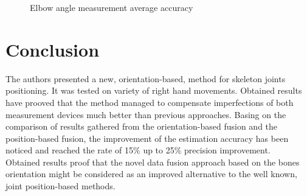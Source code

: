 \documentclass[9pt]{llncs}
\begin{document}
\begin{figure}[!htb]
	\vspace{2.5cm}
	\caption{Elbow angle measurement average accuracy}
	\label{fig:angleError}
\end{figure}

\section{Conclusion}
The authors presented a new, orientation-based, method for skeleton joints positioning. It was tested on variety of right hand movements. Obtained results have prooved that the method managed to compensate imperfections of both measurement devices much better than previous approaches. Basing on the comparison of results gathered from the orientation-based fusion and the position-based fusion, the improvement of the estimation accuracy has been noticed and reached the rate of 15\% up to 25\% precision improvement. \\
Obtained results proof that the novel data fusion approach based on the bones orientation might be considered as an improved alternative to the well known, joint position-based methods.
\end{document}
